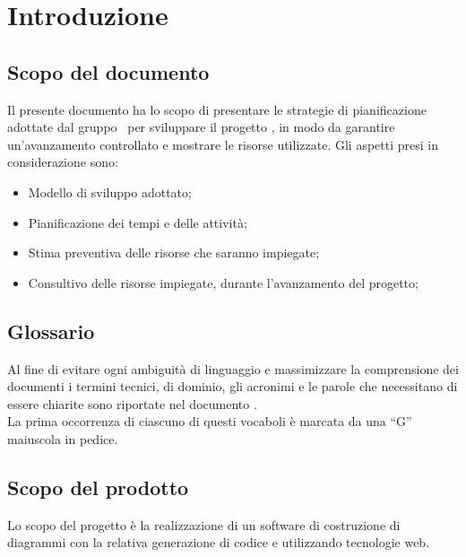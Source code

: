 \documentclass[../PianoDiProgetto.tex]{subfiles}
\begin{document}
	\section{Introduzione}
		\subsection{Scopo del documento}
			Il presente documento ha lo scopo di presentare le strategie di pianificazione adottate
			dal gruppo \kaleidoscode\  per sviluppare il progetto \progetto, in modo	da garantire un'avanzamento controllato e mostrare le risorse utilizzate.
			Gli aspetti presi in considerazione sono:
			\begin{itemize}
				\item Modello di sviluppo adottato;
				\item Pianificazione dei tempi e delle attività;
				\item Stima preventiva delle risorse che saranno impiegate;
				\item Consultivo delle risorse impiegate, durante l'avanzamento del progetto;
			\end{itemize}
		\subsection{Glossario}
		Al fine di evitare ogni ambiguità di linguaggio e massimizzare la
		comprensione dei documenti i termini tecnici, di dominio, gli
		acronimi e le parole che necessitano di essere chiarite sono
		riportate nel documento \glossariov.\\
		La prima occorrenza di ciascuno di questi vocaboli è
		marcata da una ``G'' maiuscola in pedice.
		\subsection{Scopo del prodotto}
			Lo scopo del progetto è la realizzazione di un software di
			costruzione di diagrammi  con la relativa generazione
			di codice  e  utilizzando tecnologie
			web.
\end{document}
